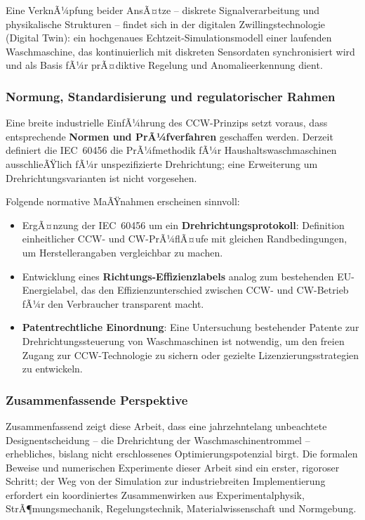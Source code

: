 ﻿\documentclass[12pt,a4paper]{article}
\theoremstyle{remark}
\begin{document}
	Eine VerknÃ¼pfung beider AnsÃ¤tze -- diskrete Signalverarbeitung und physikalische Strukturen
	-- findet sich in der digitalen Zwillingstechnologie (Digital Twin): ein hochgenaues
	Echtzeit-Simulationsmodell einer laufenden Waschmaschine, das kontinuierlich mit
	diskreten Sensordaten synchronisiert wird und als Basis fÃ¼r prÃ¤diktive Regelung und
	Anomalieerkennung dient.
	
	\subsubsection{Normung, Standardisierung und regulatorischer Rahmen}
	
	Eine breite industrielle EinfÃ¼hrung des CCW-Prinzips setzt voraus, dass entsprechende
	\textbf{Normen und PrÃ¼fverfahren} geschaffen werden. Derzeit definiert die
	IEC~60456 die PrÃ¼fmethodik fÃ¼r Haushaltswaschmaschinen ausschlieÃŸlich fÃ¼r unspezifizierte
	Drehrichtung; eine Erweiterung um Drehrichtungsvarianten ist nicht vorgesehen.
	
	Folgende normative MaÃŸnahmen erscheinen sinnvoll:
	\begin{itemize}
		\item ErgÃ¤nzung der IEC~60456 um ein \textbf{Drehrichtungsprotokoll}: Definition
		einheitlicher CCW- und CW-PrÃ¼flÃ¤ufe mit gleichen Randbedingungen,
		um Herstellerangaben vergleichbar zu machen.
		\item Entwicklung eines \textbf{Richtungs-Effizienzlabels} analog zum bestehenden
		EU-Energie\-label, das den Effizienzunterschied zwischen CCW- und CW-Betrieb fÃ¼r
		den Verbraucher transparent macht.
		\item \textbf{Patentrechtliche Einordnung}: Eine Untersuchung bestehender Patente
		zur Drehrichtungssteuerung von Waschmaschinen ist notwendig, um den freien
		Zugang zur CCW-Technologie zu sichern oder gezielte Lizenzierungsstrategien
		zu entwickeln.
	\end{itemize}
	
	\subsubsection{Zusammenfassende Perspektive}
	
	Zusammenfassend zeigt diese Arbeit, dass eine jahrzehntelang unbeachtete Designentscheidung
	-- die Drehrichtung der Waschmaschinentrommel -- erhebliches, bislang nicht erschlossenes
	Optimierungspotenzial birgt. Die formalen Beweise und numerischen Experimente dieser
	Arbeit sind ein erster, rigoroser Schritt; der Weg von der Simulation zur industrie\-breiten
	Implementierung erfordert ein koordiniertes Zusammenwirken aus Experimentalphysik,
	StrÃ¶mungsmechanik, Regelungstechnik, Materialwissenschaft und Normgebung.
	
\end{document}
